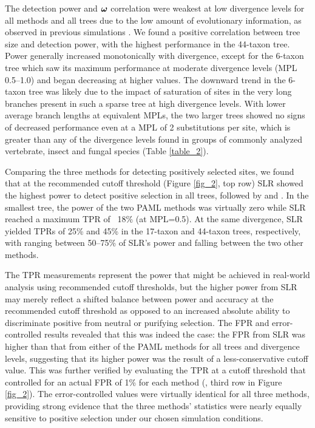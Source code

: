 \documentclass{article}
\begin{document}
The detection power and $\bm{\omega}$ correlation were weakest at low
divergence levels for all methods and all trees due to the low amount
of evolutionary information, as observed in previous simulations
\citep{Anisimova2002Accuracy}. We found a positive correlation between
tree size and detection power, with the highest performance in the
44-taxon tree. Power generally increased monotonically with
divergence, except for the 6-taxon tree which saw its maximum
performance at moderate divergence levels (MPL 0.5--1.0) and began
decreasing at higher values. The downward trend in the 6-taxon tree
was likely due to the impact of saturation of \syn sites in the
very long branches present in such a sparse tree at high divergence
levels. With lower average branch lengths at equivalent MPLs, the two
larger trees showed no signs of decreased performance even at a MPL of
2 substitutions per site, which is greater than any of the divergence
levels found in groups of commonly analyzed vertebrate, insect and
fungal species (Table \ref{table_2}).

Comparing the three methods for detecting positively selected sites, we found that at the
recommended cutoff threshold (Figure \ref{fig_2}, top row) SLR showed
the highest power to detect positive selection in all trees, followed
by \meight and \mtwo. In the smallest tree, the power of the two
PAML methods was virtually zero while SLR reached a maximum TPR of ~18\%
(at MPL=0.5). At the same divergence, SLR yielded TPRs of 25\% and 45\%
in the 17-taxon and 44-taxon trees, respectively, with \mtwo ranging
between 50--75\% of SLR's power and \meight falling between the two
other methods.

The TPR measurements represent the power that might be achieved in
real-world analysis using recommended cutoff thresholds, but the
higher power from SLR may merely reflect a shifted balance between
power and accuracy at the recommended cutoff threshold as opposed to
an increased absolute ability to discriminate positive from neutral or
purifying selection. The FPR and error-controlled \tpr results
revealed that this was indeed the case: the FPR from SLR was higher
than that from either of the PAML methods for all trees and divergence
levels, suggesting that its higher power was the result of a
less-conservative cutoff value. This was further verified by
evaluating the TPR at a cutoff threshold that controlled for an actual
FPR of 1\% for each method (\tpr{}, third row in Figure
\ref{fig_2}). The error-controlled \tpr values were virtually
identical for all three methods, providing strong evidence that the
three methods' \sw statistics were nearly equally sensitive to
positive selection under our chosen simulation conditions.
\end{document}
